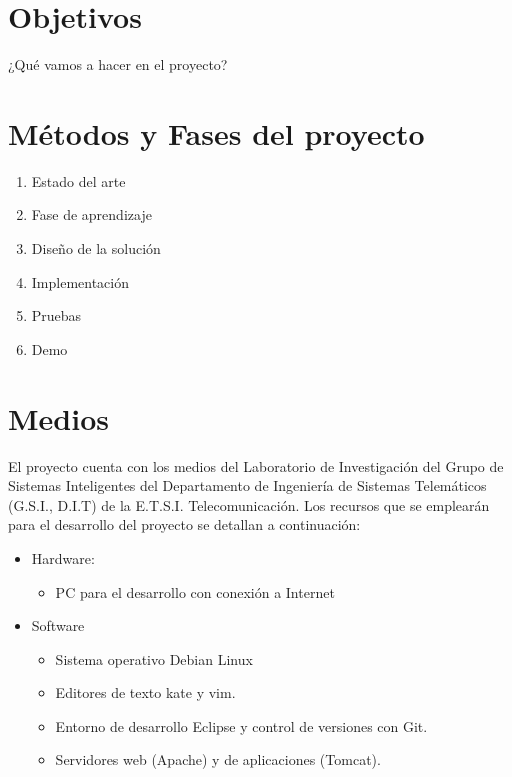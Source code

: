 \documentclass[a4paper,11pt]{report}
\begin{document}
\chapter*{Objetivos}
¿Qué vamos a hacer en el proyecto?

\chapter*{Métodos y Fases del proyecto}
\begin{enumerate}
  \item Estado del arte
  \item Fase de aprendizaje
  \item Diseño de la solución
  \item Implementación
  \item Pruebas
  \item Demo
\end{enumerate}

\chapter*{Medios}

El proyecto cuenta con los medios del Laboratorio de Investigación del Grupo de
Sistemas Inteligentes del Departamento de Ingeniería de Sistemas Telemáticos (G.S.I.,
D.I.T) de la E.T.S.I. Telecomunicación. Los recursos que se emplearán para el desarrollo
del proyecto se detallan a continuación:
\begin{itemize}
  \item Hardware:
  \begin{itemize}
    \item PC para el desarrollo con conexión a Internet
  \end{itemize}
  \item Software
  \begin{itemize}
    \item Sistema operativo Debian Linux
    \item Editores de texto kate y vim.
    \item Entorno de desarrollo Eclipse y control de versiones con Git.
    \item Servidores web (Apache) y de aplicaciones (Tomcat).
  \end{itemize}
\end{itemize}

\nocite{*}
 
{
\let\clearpage\relax
\small

}
\end{document}
